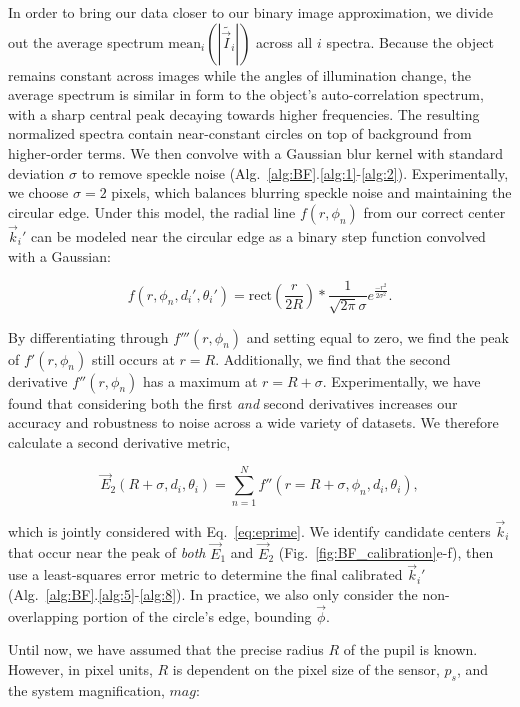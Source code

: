 In order to bring our data closer to our binary image approximation, we divide out the average spectrum $\mathrm{mean}_i(|\tilde{\vec{I}_i}|)$ across all $i$ spectra. Because the object remains constant across images while the angles of illumination change, the average spectrum is similar in form to the object's auto-correlation spectrum, with a sharp central peak decaying towards higher frequencies. The resulting normalized spectra contain near-constant circles on top of background from higher-order terms. We then convolve with a Gaussian blur kernel with standard deviation $\sigma$ to remove speckle noise (Alg.~\ref{alg:BF}.\ref{alg:1}-\ref{alg:2}). Experimentally, we choose $\sigma = 2$ pixels, which balances blurring speckle noise and maintaining the circular edge. Under this model, the radial line $f(r,\phi_n)$ from our correct center $\vec{k}_i'$ can be modeled near the circular edge as a binary step function convolved with a Gaussian:

\begin{equation}
f(r,\phi_n,d_i',\theta_i') = \text{rect}(\frac{r}{2R}) * \frac{1}{\sqrt{2\pi}\sigma}e^{\frac{-r^2}{2\sigma^2}}.
\label{eq:spoke}
\end{equation}


\noindent By differentiating through $f'''(r,\phi_n)$ and setting equal to zero, we find the peak of $f'(r,\phi_n)$ still occurs at $r=R$. Additionally, we find that the second derivative $f''(r,\phi_n)$ has a maximum at $r=R+\sigma$. Experimentally, we have found that considering both the first \textit{and} second derivatives increases our accuracy and robustness to noise across a wide variety of datasets. We therefore calculate a second derivative metric,

\begin{equation}
\vec{E}_2(R+\sigma,d_i,\theta_i)=\sum_{n=1}^{N} f''(r = R+\sigma,\phi_n,d_i,\theta_i),
\label{eq:edoubleprime}
\end{equation}

\noindent which is jointly considered with Eq.~\ref{eq:eprime}. We identify candidate centers $\vec{k}_i$ that occur near the peak of \textit{both} $\vec{E}_1$ and $\vec{E}_2$ (Fig.~\ref{fig:BF_calibration}e-f), then use a least-squares error metric to determine the final calibrated $\vec{k}_i'$ (Alg.~\ref{alg:BF}.\ref{alg:5}-\ref{alg:8}). In practice, we also only consider the non-overlapping portion of the circle's edge, bounding $\vec{\phi}$.

Until now, we have assumed that the precise radius $R$ of the pupil is known. However, in pixel units, $R$ is dependent on the pixel size of the sensor, $p_s$, and the system magnification, $mag$:

